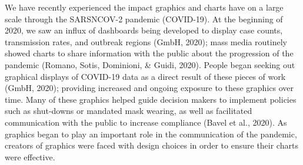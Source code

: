 \documentclass[print]{nuthesis}
\begin{document}
We have recently experienced the impact graphics and charts have on a large scale through the SARSNCOV-2 pandemic (COVID-19).
At the beginning of 2020, we saw an influx of dashboards being developed to display case counts, transmission rates, and outbreak regions (GmbH, 2020); mass media routinely showed charts to share information with the public about the progression of the pandemic (Romano, Sotis, Dominioni, \& Guidi, 2020).
People began seeking out graphical displays of COVID-19 data as a direct result of these pieces of work (GmbH, 2020); providing increased and ongoing exposure to these graphics over time. 
Many of these graphics helped guide decision makers to implement policies such as shut-downs or mandated mask wearing, as well as facilitated communication with the public to increase compliance (Bavel et al., 2020).
As graphics began to play an important role in the communication of the pandemic, creators of graphics were faced with design choices in order to ensure their charts were effective.
\end{document}
